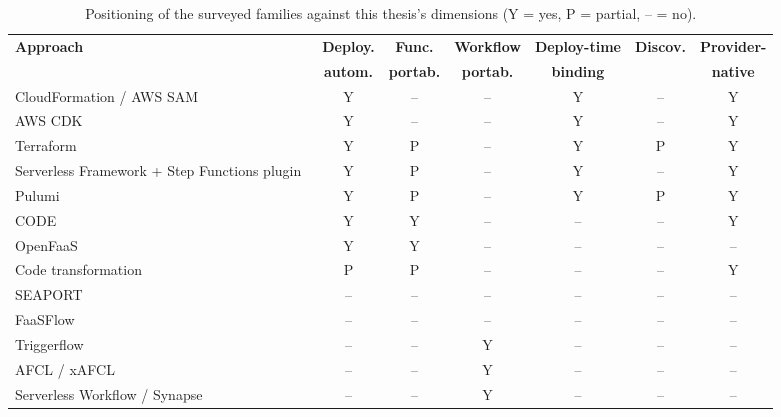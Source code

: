 \begin{table}[tbp]
  \centering
  \footnotesize
  \caption{Positioning of the surveyed families against this thesis's dimensions
  (Y = yes, P = partial, -- = no).}
  \label{tab:related-comparison}
  \setlength{\tabcolsep}{3pt}
  \begin{tabular}{|>{\raggedright\arraybackslash}p{}|c|c|c|c|c|c|}
    \hline
    \textbf{Approach} & \textbf{Deploy.} & \textbf{Func.} & \textbf{Workflow} & \textbf{Deploy-time} & \textbf{Discov.} & \textbf{Provider-} \\
     & \textbf{autom.} & \textbf{portab.} & \textbf{portab.} & \textbf{binding} & & \textbf{native} \\
     \hline
    CloudFormation / AWS SAM~\cite{awsCloudFormation,awsSamStateMachine} & Y & -- & -- & Y & -- & Y \\
    \hline
    AWS CDK~\cite{awsCdk} & Y & -- & -- & Y & -- & Y \\
    \hline
    Terraform~\cite{terraform,terraformSfnStateMachine}  & Y & P & -- & Y & P & Y \\
    \hline
    Serverless Framework + Step Functions plugin~\cite{serverlessFramework,serverlessStepFunctionsPlugin} & Y & P & -- & Y & -- & Y \\
    \hline
    Pulumi~\cite{pulumi,pulumiInputsOutputs}             & Y & P & -- & Y & P & Y \\
    \hline
    CODE~\cite{ristov2024code}                          & Y & Y & -- & -- & -- & Y \\
    \hline
    OpenFaaS~\cite{openFaaS}                            & Y & Y & -- & -- & -- & -- \\
    \hline
    Code transformation~\cite{spillner2017pythonfaas,spillnerDorodko2017javaLambda} & P & P & -- & -- & -- & Y \\
    \hline
    SEAPORT~\cite{yussupov2020seaport}                  & -- & -- & -- & -- & -- & -- \\
    \hline
    FaaSFlow~\cite{li2022faasflow}                      & -- & -- & -- & -- & -- & -- \\
    \hline
    Triggerflow~\cite{garciaLopez2020triggerflow}       & -- & -- & Y & -- & -- & -- \\
    \hline
    AFCL / xAFCL~\cite{ristov2021afcl,ristov2023xafcl}  & -- & -- & Y & -- & -- & -- \\
    \hline
    Serverless Workflow / Synapse~\cite{serverlessWorkflowSpec,serverlessworkflowSynapse} & -- & -- & Y & -- & -- & -- \\

\end{tabular}
\end{table}
